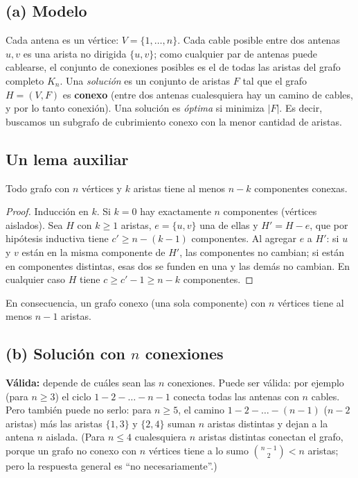 \subsection*{(a) Modelo}
Cada antena es un vértice: $V=\{1,\dots,n\}$. Cada cable posible entre dos antenas $u,v$ es una
arista no dirigida $\{u,v\}$; como cualquier par de antenas puede cablearse, el conjunto de
conexiones posibles es el de todas las aristas del grafo completo $K_n$. Una \emph{solución} es un
conjunto de aristas $F$ tal que el grafo $H=(V,F)$ es \textbf{conexo} (entre dos antenas cualesquiera
hay un camino de cables, y por lo tanto conexión). Una solución es \emph{óptima} si minimiza $|F|$.
Es decir, buscamos un subgrafo de cubrimiento conexo con la menor cantidad de aristas.

\subsection*{Un lema auxiliar}
\begin{lema}\label{l:componentes}
Todo grafo con $n$ vértices y $k$ aristas tiene al menos $n-k$ componentes conexas.
\end{lema}
\begin{proof}
Inducción en $k$. Si $k=0$ hay exactamente $n$ componentes (vértices aislados).
Sea $H$ con $k\ge1$ aristas, $e=\{u,v\}$ una de ellas y $H'=H-e$, que por hipótesis inductiva tiene
$c'\ge n-(k-1)$ componentes. Al agregar $e$ a $H'$: si $u$ y $v$ están en la misma componente de
$H'$, las componentes no cambian; si están en componentes distintas, esas dos se funden en una y
las demás no cambian. En cualquier caso $H$ tiene $c\ge c'-1\ge n-k$ componentes.
\end{proof}
\begin{observacion}
En consecuencia, un grafo conexo (una sola componente) con $n$ vértices tiene al menos $n-1$ aristas.
\end{observacion}

\subsection*{(b) Solución con $n$ conexiones}
\textbf{Válida:} depende de cuáles sean las $n$ conexiones. Puede ser válida: por ejemplo (para
$n\ge3$) el ciclo $1-2-\dots-n-1$ conecta todas las antenas con $n$ cables. Pero también puede no
serlo: para $n\ge5$, el camino $1-2-\dots-(n-1)$ ($n-2$ aristas) más las aristas $\{1,3\}$ y $\{2,4\}$
suman $n$ aristas distintas y dejan a la antena $n$ aislada. (Para $n\le 4$ cualesquiera $n$ aristas
distintas conectan el grafo, porque un grafo no conexo con $n$ vértices tiene a lo sumo
$\binom{n-1}{2}<n$ aristas; pero la respuesta general es ``no necesariamente''.)


